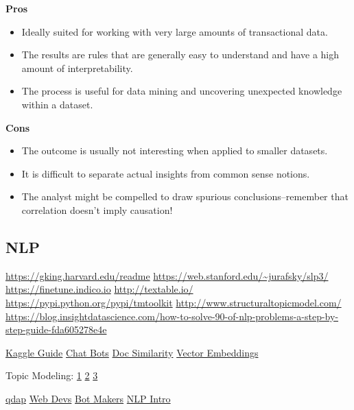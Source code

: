 \documentclass[]{book}
\begin{document}
\textbf{Pros}

\begin{itemize}
\item
  Ideally suited for working with very large amounts of transactional data.
\item
  The results are rules that are generally easy to understand and have a high amount of interpretability.
\item
  The process is useful for data mining and uncovering unexpected knowledge within a dataset.
\end{itemize}

\textbf{Cons}

\begin{itemize}
\item
  The outcome is usually not interesting when applied to smaller datasets.
\item
  It is difficult to separate actual insights from common sense notions.
\item
  The analyst might be compelled to draw spurious conclusions--remember that correlation doesn't imply causation!
\end{itemize}

\hypertarget{nlp}{%
\subsection{NLP}\label{nlp}}

\url{https://gking.harvard.edu/readme} \url{https://web.stanford.edu/~jurafsky/slp3/} \url{https://finetune.indico.io} \url{http://textable.io/} \url{https://pypi.python.org/pypi/tmtoolkit} \url{http://www.structuraltopicmodel.com/} \url{https://blog.insightdatascience.com/how-to-solve-90-of-nlp-problems-a-step-by-step-guide-fda605278e4e}

\href{https://t.co/Zcnd7EJKsn}{Kaggle Guide} \href{https://rasa.ai/}{Chat Bots} \href{http://brandonrose.org/clustering}{Doc Similarity} \href{http://bookworm.benschmidt.org/posts/2015-10-25-Word-Embeddings.html}{Vector Embeddings}

Topic Modeling: \href{http://alexperrier.github.io/jekyll/update/2015/09/04/topic-modeling-of-twitter-followers.html}{1} \href{http://chdoig.github.io/pytexas2015-topic-modeling/\#/}{2} \href{https://www.cs.princeton.edu/~blei/topicmodeling.html}{3}

\href{https://trinker.github.io/qdap/vignettes/qdap_vignette.html}{qdap} \href{http://blog.algorithmia.com/natural-language-processing-algorithms-web-developers/}{Web Devs} \href{https://stanfy.com/blog/advanced-natural-language-processing-tools-for-bot-makers/}{Bot Makers} \href{http://blog.algorithmia.com/introduction-natural-language-processing-nlp/}{NLP Intro}
\end{document}

